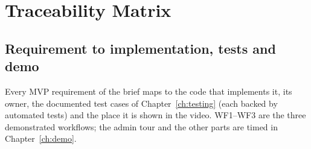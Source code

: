 \chapter{Traceability Matrix}\label{ch:traceability}

\section{Requirement to implementation, tests and demo}
Every MVP requirement of the brief maps to the code that implements it, its owner, the documented
test cases of Chapter~\ref{ch:testing} (each backed by automated tests) and the place it is shown
in the video. WF1--WF3 are the three demonstrated workflows; the admin tour and the other
parts are timed in Chapter~\ref{ch:demo}.

